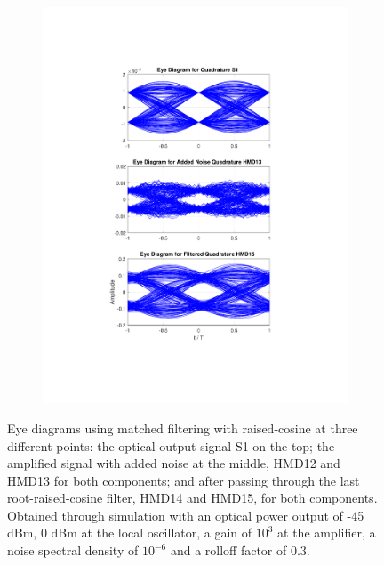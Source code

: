 \begin{figure}[H]
\begin{subfigure}{.45\textwidth}
		\includegraphics[clip, trim=5cm 4cm 5cm 4cm, width=\textwidth]{./sdf/m_qam_system/figures/eyes/q_n_p_45_03_rc.pdf}
	\end{subfigure}
	
	\caption{Eye diagrams using matched filtering with raised-cosine at three different points: the optical output signal S1 on the top; the amplified signal with added noise at the middle, HMD12 and HMD13 for both components; and after passing through the last root-raised-cosine filter, HMD14 and HMD15, for both components. Obtained through simulation with an optical power output of -45 dBm, 0 dBm at the local oscillator, a gain of $10^3$ at the amplifier, a noise spectral density of $10^{-6}$ and a rolloff factor of 0.3.\label{fig:eyes_n_rc_45_03}}
	
\end{figure}

